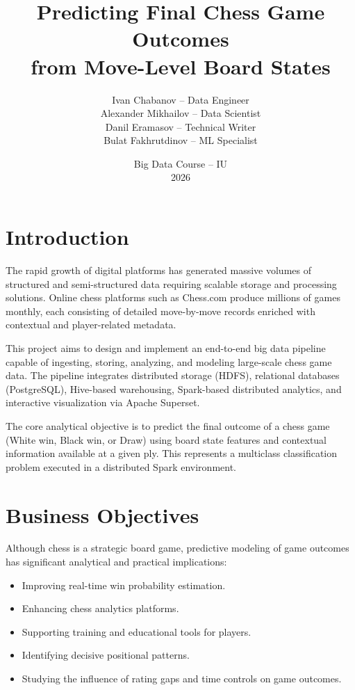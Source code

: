 \documentclass[12pt,a4paper]{article}
\title{\textbf{Predicting Final Chess Game Outcomes \\ from Move-Level Board States}}
\author{
Ivan Chabanov -- Data Engineer \\
Alexander Mikhailov -- Data Scientist \\
Danil Eramasov -- Technical Writer \\
Bulat Fakhrutdinov -- ML Specialist
}
\date{Big Data Course -- IU \\ 2026}
\begin{document}
\maketitle
\thispagestyle{empty}
\newpage

\tableofcontents
\newpage

\section{Introduction}

The rapid growth of digital platforms has generated massive volumes of structured and semi-structured data requiring scalable storage and processing solutions. Online chess platforms such as Chess.com produce millions of games monthly, each consisting of detailed move-by-move records enriched with contextual and player-related metadata.

This project aims to design and implement an end-to-end big data pipeline capable of ingesting, storing, analyzing, and modeling large-scale chess game data. The pipeline integrates distributed storage (HDFS), relational databases (PostgreSQL), Hive-based warehousing, Spark-based distributed analytics, and interactive visualization via Apache Superset.

The core analytical objective is to predict the final outcome of a chess game (White win, Black win, or Draw) using board state features and contextual information available at a given ply. This represents a multiclass classification problem executed in a distributed Spark environment.

\section{Business Objectives}

Although chess is a strategic board game, predictive modeling of game outcomes has significant analytical and practical implications:

\begin{itemize}
    \item Improving real-time win probability estimation.
    \item Enhancing chess analytics platforms.
    \item Supporting training and educational tools for players.
    \item Identifying decisive positional patterns.
    \item Studying the influence of rating gaps and time controls on game outcomes.
\end{itemize}
\end{document}
